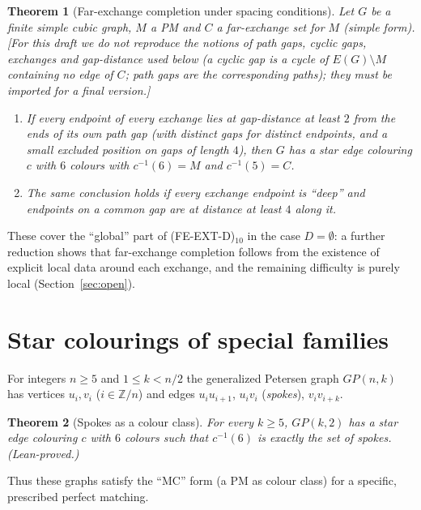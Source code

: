 \documentclass[11pt]{amsart}
\newtheorem{theorem}{Theorem}[section]
\theoremstyle{definition}
\theoremstyle{remark}
\newcommand{\hyp}[1]{\textup{(#1)}}
\newcommand{\Lean}{\textsf{Lean}}
\begin{document}
\begin{theorem}[Far-exchange completion under spacing conditions]\label{thm:rl}
Let $G$ be a finite simple cubic graph, $M$ a PM and $C$ a far-exchange set for $M$ (simple form). \textup{[For this draft we do not reproduce the notions of path gaps, cyclic gaps, exchanges and gap-distance used below (a cyclic gap is a cycle of $E(G)\setminus M$ containing no edge of $C$; path gaps are the corresponding paths); they must be imported for a final version.]}
\begin{enumerate}[label=(\alph*)]
\item If every endpoint of every exchange lies at gap-distance at least $2$ from the ends of its own path gap (with distinct gaps for distinct endpoints, and a small excluded position on gaps of length $4$), then $G$ has a star edge colouring $c$ with $6$ colours with $c^{-1}(6)=M$ and $c^{-1}(5)=C$.
\item The same conclusion holds if every exchange endpoint is ``deep'' and endpoints on a common gap are at distance at least $4$ along it.
\end{enumerate}
\end{theorem}
These cover the ``global'' part of \hyp{FE-EXT-D}$_{10}$ in the case $D=\emptyset$: a further reduction shows that far-exchange completion follows from the existence of explicit local data around each exchange, and the remaining difficulty is purely local (Section~\ref{sec:open}).

\section{Star colourings of special families}\label{sec:classes}

For integers $n\ge 5$ and $1\le k<n/2$ the generalized Petersen graph $GP(n,k)$ has vertices $u_i,v_i$ ($i\in\mathbb{Z}/n$) and edges $u_iu_{i+1}$, $u_iv_i$ (\emph{spokes}), $v_iv_{i+k}$.

\begin{theorem}[Spokes as a colour class]\label{thm:gp2spokes}
For every $k\ge 5$, $GP(k,2)$ has a star edge colouring $c$ with $6$ colours such that $c^{-1}(6)$ is exactly the set of spokes. \textup{(\Lean-proved.)}
\end{theorem}
Thus these graphs satisfy the ``MC'' form (a PM as colour class) for a specific, prescribed perfect matching.
\end{document}
